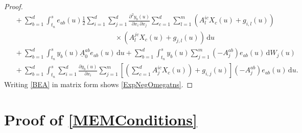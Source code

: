\documentclass[onefignum]{siamart250211}
\begin{document}
\begin{proof}
\begin{align}
&\;+\sum_{b=1}^d\int_{t_n}^se_{ab}(u)\frac{1}{2}\sum_{i=1}^d\sum_{j=1}^d\frac{\partial^2y_b(u)}{\partial x_i\,\partial x_j}\sum_{c=1}^d\sum_{l=1}^m\left(A_l^{ic}X_c(u)+g_{i,l}(u)\right)\nonumber\\
&\hspace{6cm}\times\left(A_l^{jc}X_c(u)+g_{j,l}(u)\right)\,\mathrm{d}u\nonumber\\
&\;+\sum_{b=1}^d\int_{t_n}^sy_b(u)\underline{A}_0^{ab}e_{ab}(u)\,\mathrm{d}u+\sum_{b=1}^d\int_{t_n}^sy_b(u)\sum_{j=1}^m(-A_j^{ab})e_{ab}(u)\,\mathrm{d}W_j(u)\nonumber\\
&\;+\sum_{b=1}^d\int_{t_n}^s\!\sum_{i=1}^d\frac{\partial y_b(u)}{\partial x_i}\!\sum_{j=1}^m\left[\left(\!\sum_{c=1}^dA_j^{ic}X_c(u)\!\right)+g_{i,j}(u)\right]\!\left(-A_j^{ab}\right)e_{ab}(u)\,\mathrm{d}u.\nonumber
\end{align}
Writing \cref{BEA} in matrix form shows \cref{ExpNegOmegatns}.
\end{proof}


\section[Proof of MEM errors]{Proof of \cref{MEMConditions}}\label{ProofofMEMConditions}
\end{document}
